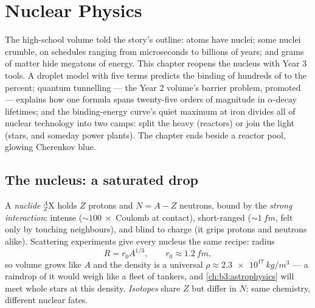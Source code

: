 \chapter{Nuclear Physics}\label{ch:b3:nuclear-physics}


The high-school volume told the story's outline: atoms have nuclei;
some nuclei crumble, on schedules ranging from microseconds to
billions of years; and grams of matter hide megatons of energy. This
chapter reopens the nucleus with Year 3 tools. A droplet model with
five terms predicts the binding of hundreds of  to the
percent; quantum tunnelling --- the Year 2 volume's barrier problem,
promoted --- explains how one formula spans twenty-five orders of
magnitude in $\alpha$-decay lifetimes; and the binding-energy curve's
quiet maximum at iron divides all of nuclear technology into two
camps: split the heavy (reactors) or join the light (stars, and
someday power plants). The chapter ends beside a reactor pool,
glowing Cherenkov blue.

\section{The nucleus: a saturated drop}

\begin{definition}\label{def:b3:nuclear-physics:nuclide}
A \emph{nuclide} $^{A}_{Z}\text{X}$ holds $Z$ protons and $N = A -
Z$ neutrons, bound by the \emph{strong interaction}: intense
(${\sim}\qty{100}{}\times$ Coulomb at contact), short-ranged
(${\sim}\qty{1}{fm}$, felt only by touching neighbours), and blind
to charge (it grips protons and neutrons alike). Scattering
experiments give every nucleus the same recipe: radius
\[
R = r_0A^{1/3} , \qquad r_0 \approx \qty{1.2}{fm} ,
\]
so volume grows like $A$ and the density is a universal
$\rho \approx \qty{2.3e17}{kg/m^3}$ --- a raindrop of it would
weigh like a fleet of tankers, and
\cref{ch:b3:astrophysics} will meet whole stars at this density.
\emph{Isotopes} share $Z$ but differ in $N$: same chemistry,
different nuclear fates.
\end{definition}

